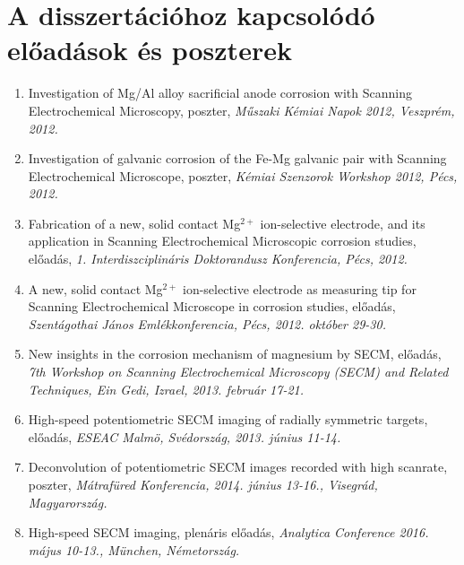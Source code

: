 \documentclass[11pt,a4paper,roman]{article}
\begin{document}
\section{A disszertációhoz kapcsolódó előadások és poszterek}
\begin{enumerate}
\item Investigation of Mg/Al alloy sacrificial anode corrosion with Scanning Electrochemical Microscopy, poszter, \emph{Műszaki Kémiai Napok 2012, Veszprém, 2012.}

\item Investigation of galvanic corrosion of the Fe-Mg galvanic pair with Scanning Electrochemical Microscope, poszter, \emph{Kémiai Szenzorok Workshop 2012, Pécs, 2012.}

\item Fabrication of a new, solid contact Mg$^{2+}$ ion-selective electrode, and its application in Scanning Electrochemical Microscopic corrosion studies, előadás, \emph{1. Interdiszciplináris Doktorandusz Konferencia, Pécs, 2012.}

\item A new, solid contact Mg$^{2+}$ ion-selective electrode as measuring tip for Scanning Electrochemical Microscope in corrosion studies, előadás, \emph{Szentágothai János Emlékkonferencia, Pécs, 2012. október 29-30.}

\item New insights in the corrosion mechanism of magnesium by SECM, előadás, \emph{7th Workshop on Scanning Electrochemical Microscopy (SECM) and Related Techniques, Ein Gedi, Izrael, 2013. február 17-21.}

\item High-speed potentiometric SECM imaging of radially symmetric targets, előadás, \emph{ESEAC Malmö, Svédország, 2013. június 11-14.}

\item Deconvolution of potentiometric SECM images recorded with high scanrate, poszter, \emph{Mátrafüred Konferencia, 2014. június 13-16., Visegrád, Magyarország.}

\item High-speed SECM imaging, plenáris előadás, \emph{Analytica Conference 2016. május 10-13., München, Németország.}
\end{enumerate}
\end{document}
